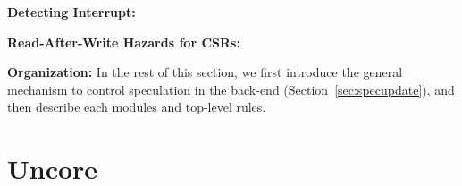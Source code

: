 \documentclass[12pt]{article}
\begin{document}
\noindent\textbf{Detecting Interrupt:}

\noindent\textbf{Read-After-Write Hazards for CSRs:}

\noindent\textbf{Organization:}
In the rest of this section, we first introduce the general mechanism to control speculation in the back-end (Section~\ref{sec:specupdate}), and then describe each modules and top-level rules.

























\section{Uncore}
\end{document}
